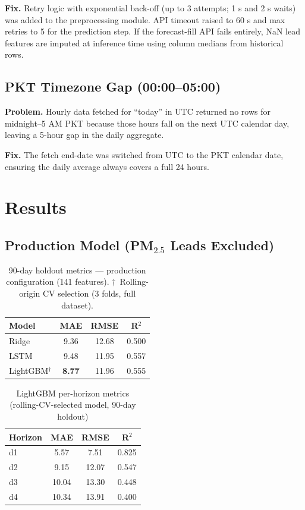\documentclass[11pt,a4paper]{article}
\begin{document}
\textbf{Fix.}\; Retry logic with exponential back-off (up to 3 attempts; 1 s and
2 s waits) was added to the preprocessing module. API timeout raised to 60 s and
max retries to 5 for the prediction step. If the forecast-fill API fails entirely,
NaN lead features are imputed at inference time using column medians from
historical rows.

\subsection{PKT Timezone Gap (00:00–05:00)}

\textbf{Problem.}\; Hourly data fetched for ``today'' in UTC returned no rows for
midnight–5 AM PKT because those hours fall on the next UTC calendar day, leaving a
5-hour gap in the daily aggregate.

\textbf{Fix.}\; The fetch end-date was switched from UTC to the PKT calendar date,
ensuring the daily average always covers a full 24 hours.

\section{Results}

\subsection{Production Model (PM$_{2.5}$ Leads Excluded)}

\begin{table}[H]
\centering
\caption{90-day holdout metrics — production configuration (141 features).
         $\dagger$~Rolling-origin CV selection (3 folds, full dataset).}
\begin{tabular}{lccc}
\toprule
\textbf{Model} & \textbf{MAE} & \textbf{RMSE} & \textbf{R$^2$} \\
\midrule
Ridge                       & 9.36 & 12.68 & 0.500 \\
LSTM                        & 9.48 & 11.95 & 0.557 \\
LightGBM$^\dagger$          & \textbf{8.77} & 11.96 & 0.555 \\
\bottomrule
\end{tabular}
\end{table}

\begin{table}[H]
\centering
\caption{LightGBM per-horizon metrics (rolling-CV-selected model, 90-day holdout)}
\begin{tabular}{lccc}
\toprule
\textbf{Horizon} & \textbf{MAE} & \textbf{RMSE} & \textbf{R$^2$} \\
\midrule
d1 &  5.57 &  7.51 & 0.825 \\
d2 &  9.15 & 12.07 & 0.547 \\
d3 & 10.04 & 13.30 & 0.448 \\
d4 & 10.34 & 13.91 & 0.400 \\
\bottomrule
\end{tabular}
\end{table}
\end{document}
